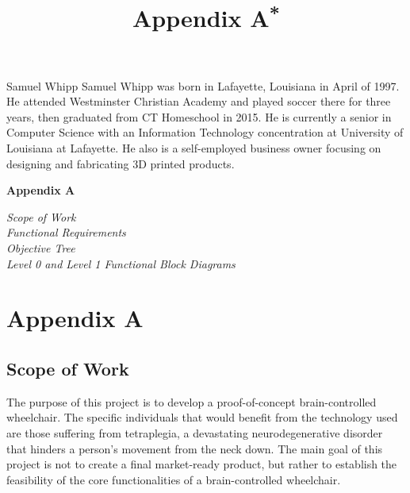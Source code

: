 \documentclass[conference]{IEEEtran}
\begin{document}
\vspace{-100mm}
\begin{IEEEbiography}{Samuel Whipp}
Samuel Whipp was born in Lafayette, Louisiana in April of 1997. He attended Westminster Christian Academy and played soccer there for three years, then graduated from CT Homeschool in 2015. He is currently a senior in Computer Science with an Information Technology concentration at University of Louisiana at Lafayette. He also is a self-employed business owner focusing on designing and fabricating 3D printed products.
    
\end{IEEEbiography}
\vspace{12pt}

\renewcommand{\appendixname}{Appendices}
\let\appendix\relax
\appendix

\clearpage
\onecolumn
\begin{center}
    \vspace*{4.5cm}
     {\Huge\bfseries Appendix A \par}
     \vspace{1cm}
    \textit{Scope of Work} \\
    \textit{Functional Requirements} \\
    \textit{Objective Tree} \\
    \textit{Level 0 and Level 1 Functional Block Diagrams}
\end{center}


\clearpage
\twocolumn

\renewcommand{\thesubsection}{A.\Alph{subsection}}
\title{Appendix A{\footnotesize \textsuperscript{*}}}
\section*{\textbf{Appendix A}}
    \setcounter{subsection}{0}
    \subsection{Scope of Work}
    The purpose of this project is to develop a proof-of-concept brain-controlled wheelchair. The specific individuals that would benefit from the technology used are those suffering from tetraplegia, a devastating neurodegenerative disorder that hinders a person's movement from the neck down. The main goal of this project is not to create a final market-ready product, but rather to establish the feasibility of the core functionalities of a brain-controlled wheelchair. 
    
\end{document}
